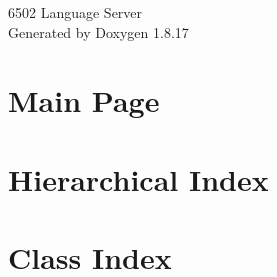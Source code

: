 \let\mypdfximage\pdfximage\def\pdfximage{\immediate\mypdfximage}\documentclass[twoside]{book}
\newcommand{\+}{\discretionary{\mbox{\scriptsize$\hookleftarrow$}}{}{}}
\newcommand{\clearemptydoublepage}{%
  \newpage{\pagestyle{empty}\cleardoublepage}%
}
\begin{document}
\hypersetup{pageanchor=false,
             bookmarksnumbered=true,
             pdfencoding=unicode
            }
\begin{titlepage}
\vspace*{7cm}
\begin{center}%
{\Large 6502 Language Server }\\
\vspace*{1cm}
{\large Generated by Doxygen 1.8.17}\\
\end{center}
\end{titlepage}
\clearemptydoublepage
{}
\tableofcontents
\clearemptydoublepage
{}
\hypersetup{pageanchor=true}

\chapter{Main Page}
\label{index}\hypertarget{index}{}
\chapter{Hierarchical Index}

\chapter{Class Index}

\end{document}
